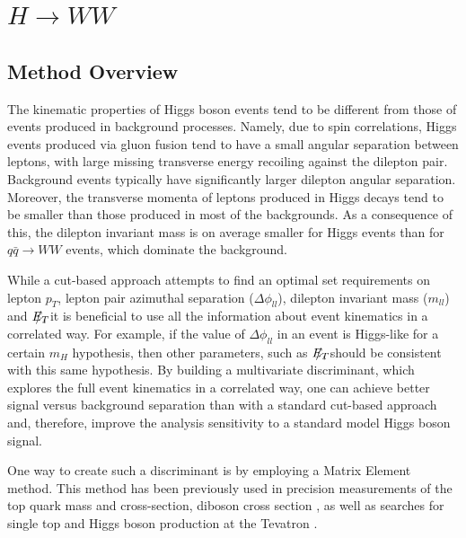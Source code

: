 \documentclass{cmspaper}
\newcommand{\met}{\mbox{$E_T\hspace{-1.1em}/$\hspace{0.7em}}}
\begin{document}
\section{$H \rightarrow WW$ }
\subsection{Method Overview}
\label{sec:Meth_Overview}
The kinematic properties of Higgs boson events tend to be different from those of events produced in background processes.
Namely, due to spin correlations, Higgs events produced via gluon fusion tend to have a small angular separation between 
leptons, with large missing transverse energy recoiling against the dilepton pair. Background events typically have significantly
larger dilepton angular separation.  Moreover,  the transverse momenta of leptons produced in Higgs decays tend to be smaller
than those produced in most of the backgrounds. As a consequence of this, the dilepton invariant mass is on average smaller for Higgs events
than for $q\bar{q} \rightarrow WW$ events, which dominate the background.

While a cut-based approach attempts to find an optimal set requirements on lepton $p_{T}$, lepton pair azimuthal separation ($\Delta\phi_{ll}$), 
dilepton invariant mass  ($m_{ll}$) and \met, it is beneficial to use all the information about event kinematics in a correlated way. 
For example, if the value of $\Delta\phi_{ll}$ in an event is Higgs-like for a certain $m_{H}$ hypothesis, then other parameters, such as  
\met, should be consistent with this same hypothesis. By building a multivariate discriminant, which explores the full event kinematics
in a correlated way, one can achieve better signal versus background separation than with a standard cut-based approach and, 
therefore, improve the analysis sensitivity to a standard model Higgs boson signal.

One way to create such a discriminant is by employing a Matrix Element method. This method has been previously used in precision
measurements of the top quark mass \cite{ref:CDFTopMass,ref:D0TopMass} and cross-section, diboson cross section \cite{ref:CDFDiboson}, 
as well as searches for single top \cite{ref:CDFSingleTop,ref:D0SingleTop} and Higgs boson production at the Tevatron \cite{ref:CDFHiggs,ref:D0Higgs}.
\end{document}
